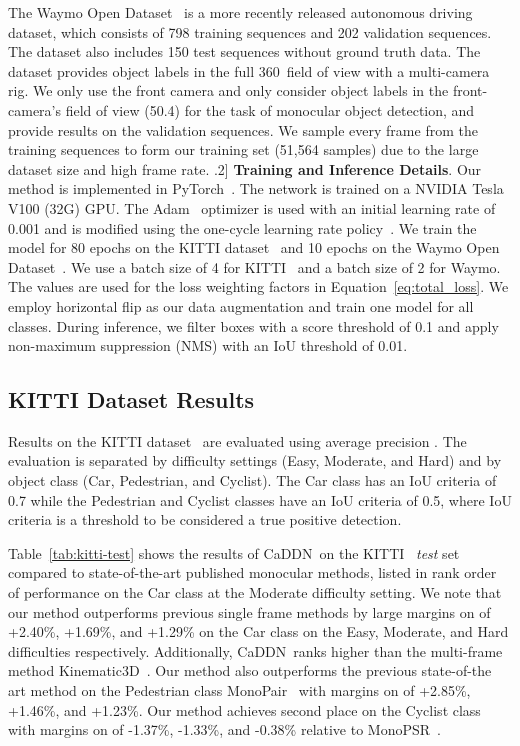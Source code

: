\documentclass[final]{cvpr}
\newcommand{\method}{CaDDN}
\begin{document}
The Waymo Open Dataset~\cite{waymo} is a more recently released autonomous driving dataset, which consists of 798 training sequences and 202 validation sequences. The dataset also includes 150 test sequences without ground truth data. The dataset provides object labels in the full 360\degree~field of view with a multi-camera rig. We only use the front camera and only consider object labels in the front-camera's field of view (50.4\degree) for the task of monocular object detection, and provide results on the validation sequences. We sample every  frame from the training sequences to form our training set (51,564 samples) due to the large dataset size and high frame rate.
\0.2\baselineskip]
\noindent
\textbf{Training and Inference Details}.
Our method is implemented in PyTorch~\cite{Pytorch}. The network is trained on a NVIDIA Tesla V100 (32G) GPU. The Adam~\cite{Adam} optimizer is used with an initial learning rate of 0.001 and is modified using the one-cycle learning rate policy~\cite{onecycle}. We train the model for 80 epochs on the KITTI dataset~\cite{Kitti} and 10 epochs on the Waymo Open Dataset~\cite{waymo}. We use a batch size of 4 for KITTI~\cite{Kitti} and a batch size of 2 for Waymo.  The values  are used for the loss weighting factors in Equation~\ref{eq:total_loss}. We employ horizontal flip as our data augmentation and train one model for all classes. During inference, we filter boxes with a score threshold of 0.1 and apply non-maximum suppression (NMS) with an IoU threshold of 0.01.
\subsection{KITTI Dataset Results} \label{KITTI Dataset Results}
Results on the KITTI dataset~\cite{Kitti} are evaluated using average precision . The evaluation is separated by difficulty settings (Easy, Moderate, and Hard) and by object class (Car, Pedestrian, and Cyclist). The Car class has an IoU criteria of 0.7 while the Pedestrian and Cyclist classes have an IoU criteria of 0.5, where IoU criteria is a threshold to be considered a true positive detection.

Table~\ref{tab:kitti-test} shows the results of \method~on the KITTI~\cite{Kitti} \textit{test} set compared to state-of-the-art published monocular methods, listed in rank order of performance on the Car class at the Moderate difficulty setting. We note that our method outperforms previous single frame methods by large margins on  of +2.40\%, +1.69\%, and +1.29\% on the Car class on the Easy, Moderate, and Hard difficulties respectively. Additionally, \method~ranks higher than the multi-frame method Kinematic3D~\cite{Kinematic3D}. Our method also outperforms the previous state-of-the art method on the Pedestrian class MonoPair~\cite{MonoPair} with margins on  of +2.85\%, +1.46\%, and +1.23\%. Our method achieves second place on the Cyclist class with margins on  of -1.37\%, -1.33\%, and -0.38\% relative to MonoPSR~\cite{monopsr}.
\end{document}
